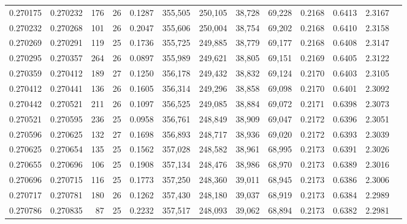 \begin{tabular}{rrrrrrrrrrrrr}
0.270175 & 0.270232 &   176 &  26 &                                     0.1287 & 355,505 & 250,105 &  38,728 &  69,228 & 0.2168 & 0.6413 & 2.3167 \\
0.270232 & 0.270268 &   101 &  26 &                                     0.2047 & 355,606 & 250,004 &  38,754 &  69,202 & 0.2168 & 0.6410 & 2.3158 \\
0.270269 & 0.270291 &   119 &  25 &                                     0.1736 & 355,725 & 249,885 &  38,779 &  69,177 & 0.2168 & 0.6408 & 2.3147 \\
0.270295 & 0.270357 &   264 &  26 &                                     0.0897 & 355,989 & 249,621 &  38,805 &  69,151 & 0.2169 & 0.6405 & 2.3122 \\
0.270359 & 0.270412 &   189 &  27 &                                     0.1250 & 356,178 & 249,432 &  38,832 &  69,124 & 0.2170 & 0.6403 & 2.3105 \\
0.270412 & 0.270441 &   136 &  26 &                                     0.1605 & 356,314 & 249,296 &  38,858 &  69,098 & 0.2170 & 0.6401 & 2.3092 \\
0.270442 & 0.270521 &   211 &  26 &                                     0.1097 & 356,525 & 249,085 &  38,884 &  69,072 & 0.2171 & 0.6398 & 2.3073 \\
0.270521 & 0.270595 &   236 &  25 &                                     0.0958 & 356,761 & 248,849 &  38,909 &  69,047 & 0.2172 & 0.6396 & 2.3051 \\
0.270596 & 0.270625 &   132 &  27 &                                     0.1698 & 356,893 & 248,717 &  38,936 &  69,020 & 0.2172 & 0.6393 & 2.3039 \\
0.270625 & 0.270654 &   135 &  25 &                                     0.1562 & 357,028 & 248,582 &  38,961 &  68,995 & 0.2173 & 0.6391 & 2.3026 \\
0.270655 & 0.270696 &   106 &  25 &                                     0.1908 & 357,134 & 248,476 &  38,986 &  68,970 & 0.2173 & 0.6389 & 2.3016 \\
0.270696 & 0.270715 &   116 &  25 &                                     0.1773 & 357,250 & 248,360 &  39,011 &  68,945 & 0.2173 & 0.6386 & 2.3006 \\
0.270717 & 0.270781 &   180 &  26 &                                     0.1262 & 357,430 & 248,180 &  39,037 &  68,919 & 0.2173 & 0.6384 & 2.2989 \\
0.270786 & 0.270835 &    87 &  25 &                                     0.2232 & 357,517 & 248,093 &  39,062 &  68,894 & 0.2173 & 0.6382 & 2.2981 \\

\end{tabular}
